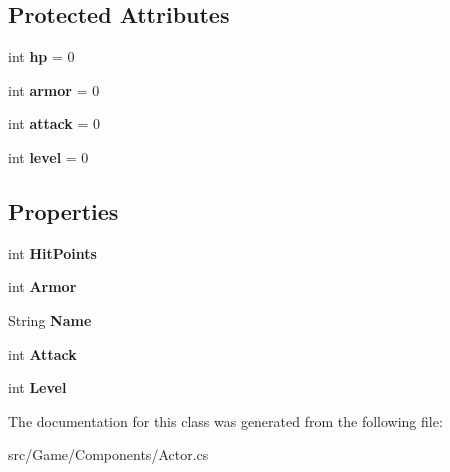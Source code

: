 \subsection*{Protected Attributes}
\begin{DoxyCompactItemize}
\item 
\mbox{\label{class_game_1_1_components_1_1_actor_a247427a6853d4195765fff7f44a0a6c4}} 
int {\bfseries hp} = 0
\item 
\mbox{\label{class_game_1_1_components_1_1_actor_a4f53debbc0203e35cef271e4b94439f3}} 
int {\bfseries armor} = 0
\item 
\mbox{\label{class_game_1_1_components_1_1_actor_a1fd6e57eab26c86802d6db3f88bd70c2}} 
int {\bfseries attack} = 0
\item 
\mbox{\label{class_game_1_1_components_1_1_actor_a84ca07cf456a329c6a3e1e6d4d9b3799}} 
int {\bfseries level} = 0
\end{DoxyCompactItemize}
\subsection*{Properties}
\begin{DoxyCompactItemize}
\item 
\mbox{\label{class_game_1_1_components_1_1_actor_a61eb4ec857ac6ed3dacdc122cfbe438a}} 
int {\bfseries Hit\+Points}
\item 
\mbox{\label{class_game_1_1_components_1_1_actor_a502fd4fc55d418a847ef466bf09c96fa}} 
int {\bfseries Armor}
\item 
\mbox{\label{class_game_1_1_components_1_1_actor_a244881aa54d3b73f74f09fb36e779837}} 
String {\bfseries Name}
\item 
\mbox{\label{class_game_1_1_components_1_1_actor_aba6d2c82ffd258df393f4e08dbd74652}} 
int {\bfseries Attack}
\item 
\mbox{\label{class_game_1_1_components_1_1_actor_aa3ea2c47b83cb50a7aaebe145a6b2f59}} 
int {\bfseries Level}
\end{DoxyCompactItemize}


The documentation for this class was generated from the following file\+:\begin{DoxyCompactItemize}
\item 
src/\+Game/\+Components/Actor.\+cs\end{DoxyCompactItemize}
